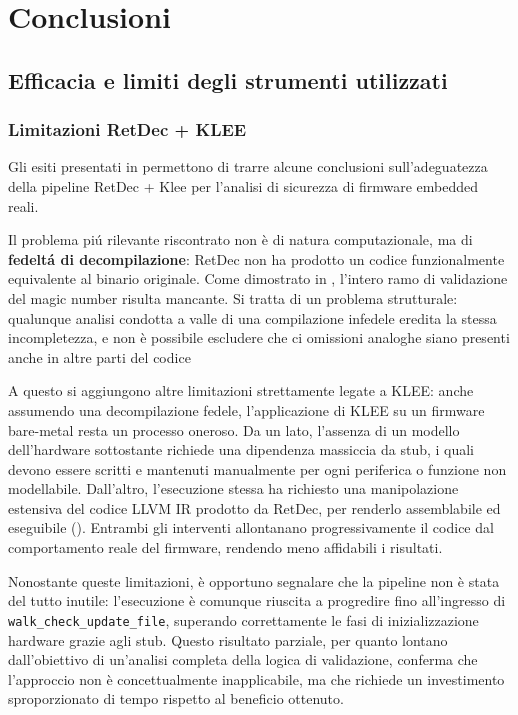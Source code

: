 \newpage
\chapter{Conclusioni}
\label{chap:conclusioni}
    \section{Efficacia e limiti degli strumenti utilizzati}
    \label{subsec:limiti_strumenti}
        \subsection{Limitazioni RetDec + KLEE}
        \label{subsec:limiti_retdec+klee}
            Gli esiti presentati in  permettono di trarre alcune conclusioni sull'adeguatezza della pipeline RetDec + Klee per l'analisi di sicurezza di firmware embedded reali.
    
            Il problema piú rilevante riscontrato non è di natura computazionale, ma di \textbf{fedeltá di decompilazione}: RetDec non ha prodotto un codice funzionalmente equivalente al binario originale. Come dimostrato in , l'intero ramo di validazione del magic number risulta mancante. Si tratta di un problema strutturale: qualunque analisi condotta a valle di una compilazione infedele eredita la stessa incompletezza, e non è possibile escludere che ci omissioni analoghe siano presenti anche in altre parti del codice
    
            A questo si aggiungono altre limitazioni strettamente legate a KLEE: anche assumendo una decompilazione fedele, l'applicazione di KLEE su un firmware bare-metal resta un processo oneroso. Da un lato, l'assenza di un modello dell'hardware sottostante richiede una dipendenza massiccia da stub, i quali devono essere scritti e mantenuti manualmente per ogni periferica o funzione non modellabile. Dall'altro, l'esecuzione stessa ha richiesto una manipolazione estensiva del codice LLVM IR prodotto da RetDec, per renderlo assemblabile ed eseguibile (). Entrambi gli interventi allontanano progressivamente il codice dal comportamento reale del firmware, rendendo meno affidabili i risultati.
    
            Nonostante queste limitazioni, è opportuno segnalare che la pipeline non è stata del tutto inutile: l'esecuzione è comunque riuscita a progredire fino all'ingresso di \\\texttt{walk\_check\_update\_file}, superando correttamente le fasi di inizializzazione hardware grazie agli stub. Questo risultato parziale, per quanto lontano dall'obiettivo di un'analisi completa della logica di validazione, conferma che l'approccio non è concettualmente inapplicabile, ma che richiede un investimento sproporzionato di tempo rispetto al beneficio ottenuto.
    
